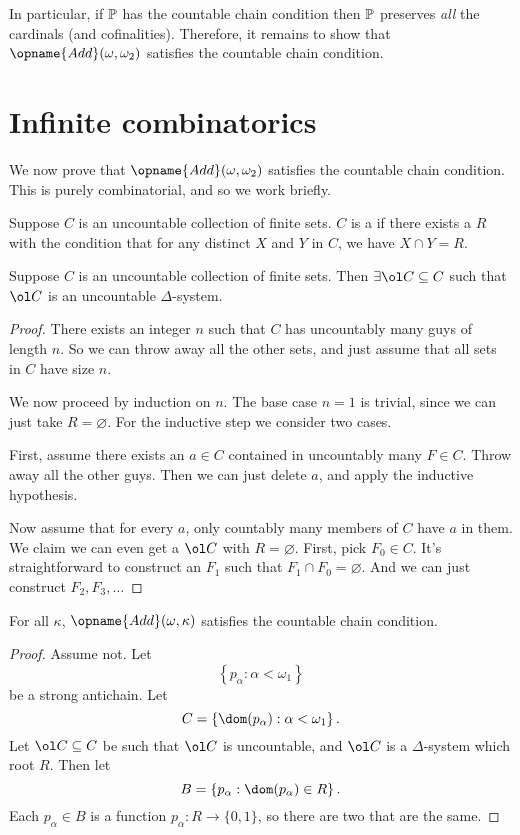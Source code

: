 In particular, if $\mathbb P$ has the countable chain condition then $\mathbb P$ preserves \emph{all} the cardinals (and cofinalities).
Therefore, it remains to show that $\opname{Add}(\omega, \omega_2)$ satisfies the countable chain condition.

\section{Infinite combinatorics}
We now prove that $\opname{Add}(\omega, \omega_2)$ satisfies the countable chain condition.
This is purely combinatorial, and so we work briefly.

\begin{definition}
	Suppose $C$ is an uncountable collection of finite sets.
	$C$ is a  if there exists a  $R$
	with the condition that for any distinct $X$ and $Y$
	in $C$, we have $X \cap Y = R$.
\end{definition}

\begin{lemma}
	 Suppose $C$ is an uncountable collection of finite sets.
	Then $\exists \ol C \subseteq C$ such that $\ol C$ is an uncountable $\Delta$-system.
\end{lemma}
\begin{proof}
	There exists an integer $n$ such that $C$ has uncountably many guys of length $n$.
	So we can throw away all the other sets, and just assume that all sets in $C$ have size $n$.

	We now proceed by induction on $n$.
	The base case $n=1$ is trivial, since we can just take $R = \varnothing$.
	For the inductive step we consider two cases.

	First, assume there exists an $a \in C$ contained in uncountably many $F \in C$.
	Throw away all the other guys.
	Then we can just delete $a$, and apply the inductive hypothesis.

	Now assume that for every $a$, only countably many members of $C$ have $a$ in them.
	We claim we can even get a $\ol C$ with $R = \varnothing$.
	First, pick $F_0 \in C$.
	It's straightforward to construct an $F_1$ such that $F_1 \cap F_0 = \varnothing$.
	And we can just construct $F_2, F_3, \dots$
\end{proof}

\begin{lemma}
	For all $\kappa$, $\opname{Add}(\omega, \kappa)$ satisfies the countable chain condition.
\end{lemma}
\begin{proof}
	Assume not. Let
	\[ \left\{ p_\alpha : \alpha < \omega_1 \right\} \]
	be a strong antichain.  Let
	\[ C = \left\{ \dom(p_\alpha) : \alpha < \omega_1 \right\}. \]
	Let $\ol C \subseteq C$ be such that $\ol C$ is uncountable, and $\ol C$ is a $\Delta$-system which root $R$.
	Then let
	\[ B = \left\{ p_\alpha : \dom(p_\alpha) \in R \right\}. \]
	Each $p_\alpha \in B$ is a function $p_\alpha : R \to \{0,1\}$,
	so there are two that are the same.
\end{proof}

